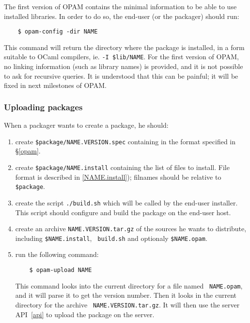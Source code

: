\documentclass[a4paper,11pt]{article}
\begin{document}
The first version of OPAM contains the minimal information to be able
to use installed libraries. In order to do so, the end-user (or the
packager) should run:

\begin{verbatim}
    $ opam-config -dir NAME
\end{verbatim}

This command will return the directory where the package is installed,
in a form suitable to OCaml compilers, ie. {\tt -I \$lib/NAME}. For
the first version of OPAM, no linking information (such as library
names) is provided, and it is not possible to ask for recursive
queries. It is understood that this can be painful; it will be
fixed in next milestones of OPAM.

\subsubsection{Uploading packages}
\label{upload}

When a packager wants to create a package, he should:

\begin{enumerate}

\item create {\tt \$package/NAME.VERSION.spec} containing in the format
  specified in \S\ref{opam}.

\item create {\tt \$package/NAME.install} containing the list of files
  to install. File format is described in \ref{NAME.install});
  filnames should be relative to {\tt \$package}.

\item create the script {\tt ./build.sh} which will be called by the
  end-user installer. This script should configure and build the
  package on the end-user host.

\item create an archive {\tt NAME.VERSION.tar.gz} of the sources he
  wants to distribute, including {\tt \$NAME.install}, {\tt
    build.sh} and optionaly {\tt \$NAME.opam}.

\item run the following command:

\begin{verbatim}
    $ opam-upload NAME
\end{verbatim}

This command looks into the current directory for a file named {\tt
  NAME.opam}, and it will parse it to get the version number. Then it
looks in the current directory for the archive {\tt
  NAME.VERSION.tar.gz}. It will then use the server API~\ref{api} to
upload the package on the server.

\end{enumerate}
\end{document}
